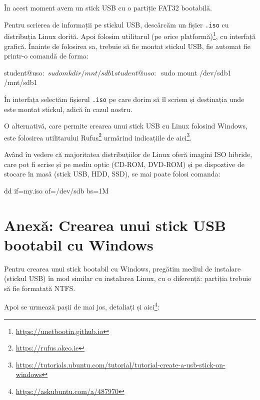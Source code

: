 În acest moment avem un stick USB cu o partiție FAT32 bootabilă.

Pentru scrierea de informații pe stickul USB, descărcăm un fișier \texttt{.iso}
cu distribuția
Linux dorită. Apoi folosim utilitarul  (pe orice
platformă)\footnote{\url{https://unetbootin.github.io}}, cu interfață grafică.
Înainte de folosirea sa, trebuie să fie montat stickul USB, fie automat fie
printr-o comandă de forma:

\begin{screen}
student@uso:~$ sudo mkdir /mnt/sdb1
student@uso:~$ sudo mount /dev/sdb1 /mnt/sdb1
\end{screen}

În interfața  selectăm fișierul \texttt{.iso} pe care dorim să îl scriem și
destinația unde este montat stickul, adică  în cazul nostru.

O alternativă, care permite crearea unui stick USB cu Linux folosind Windows,
este folosirea utilitarului Rufus\footnote{\url{https://rufus.akeo.ie}} urmărind
indicațiile de
aici\footnote{\url{https://tutorials.ubuntu.com/tutorial/tutorial-create-a-usb-stick-on-windows}}.

Având în vedere că majoritatea distribuțiilor de Linux oferă imagini ISO hibride, care pot fi scrise
și pe mediu optic (CD-ROM, DVD-ROM) și pe dispoztive de stocare în masă (stick USB, HDD, SSD), se mai poate folosi comanda:
\begin{screen}
	dd if=my.iso of=/dev/sdb bs=1M
\end{screen}

\section{Anexă: Crearea unui stick USB bootabil cu Windows}
\label{sec:boot:usb-windows}

Pentru crearea unui stick bootabil cu Windows, pregătim mediul de instalare
(stickul USB) în mod similar cu instalarea Linux, cu o diferență: partiția
trebuie să fie formatată NTFS.

Apoi se urmează pașii de mai jos, detaliați și
aici\footnote{\url{https://askubuntu.com/a/487970}}:

